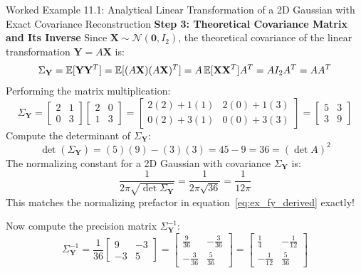 \begin{examplebox}[breakable]{Worked Example 11.1: Analytical Linear Transformation of a 2D Gaussian with Exact Covariance Reconstruction}
\textbf{Step 3: Theoretical Covariance Matrix and Its Inverse}
Since $\mathbf{X} \sim \mathcal{N}(\mathbf{0}, I_2)$, the theoretical covariance of the linear transformation $\mathbf{Y} = A\mathbf{X}$ is:
\begin{equation}
\Sigma_{\mathbf{Y}} = \operatorname{\mathbb{E}}[\mathbf{Y}\mathbf{Y}^T] = \operatorname{\mathbb{E}}[(A\mathbf{X})(A\mathbf{X})^T] = A \operatorname{\mathbb{E}}[\mathbf{X}\mathbf{X}^T] A^T = A I_2 A^T = A A^T
\end{equation}
Performing the matrix multiplication:
\begin{equation}
\Sigma_{\mathbf{Y}} = \begin{bmatrix} 2 & 1 \\ 0 & 3 \end{bmatrix} \begin{bmatrix} 2 & 0 \\ 1 & 3 \end{bmatrix} = \begin{bmatrix} 2(2) + 1(1) & 2(0) + 1(3) \\ 0(2) + 3(1) & 0(0) + 3(3) \end{bmatrix} = \begin{bmatrix} 5 & 3 \\ 3 & 9 \end{bmatrix}
\end{equation}
Compute the determinant of $\Sigma_{\mathbf{Y}}$:
\begin{equation}
\det(\Sigma_{\mathbf{Y}}) = (5)(9) - (3)(3) = 45 - 9 = 36 = (\det A)^2
\end{equation}
The normalizing constant for a 2D Gaussian with covariance $\Sigma_{\mathbf{Y}}$ is:
\begin{equation}
\frac{1}{2\pi \sqrt{\det \Sigma_{\mathbf{Y}}}} = \frac{1}{2\pi \sqrt{36}} = \frac{1}{12\pi}
\end{equation}
This matches the normalizing prefactor in equation~\eqref{eq:ex_fy_derived} exactly!

Now compute the precision matrix $\Sigma_{\mathbf{Y}}^{-1}$:
\begin{equation}
\Sigma_{\mathbf{Y}}^{-1} = \frac{1}{36} \begin{bmatrix} 9 & -3 \\ -3 & 5 \end{bmatrix} = \begin{bmatrix} \frac{9}{36} & -\frac{3}{36} \\ -\frac{3}{36} & \frac{5}{36} \end{bmatrix} = \begin{bmatrix} \frac{1}{4} & -\frac{1}{12} \\ -\frac{1}{12} & \frac{5}{36} \end{bmatrix}
\end{equation}


\end{examplebox}
